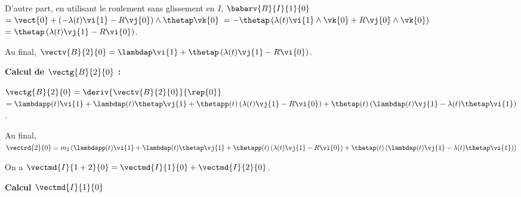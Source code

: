D'autre part, en utilisant le roulement sans glissement en $I$, 
$\babarv{B}{I}{1}{0} $ $=\vect{0}+\left(-\lambda(t)\vi{1}-R\vj{0} \right)\wedge\thetap \vk{0}$
$=-\thetap\left(\lambda(t)\vi{1}\wedge \vk{0}+R\vj{0}\wedge \vk{0} \right)$
$=\thetap\left(\lambda(t)\vj{1}-R\vi{0} \right)$.

Au final, $\vectv{B}{2}{0} = \lambdap\vi{1} + \thetap\left(\lambda(t)\vj{1}-R\vi{0} \right)$.

\vspace{.5cm}

\textbf{Calcul de $ \vectg{B}{2}{0}$ :}

$\vectg{B}{2}{0} = \deriv{\vectv{B}{2}{0}}{\rep{0}}$
$ = \lambdapp(t)\vi{1} +\lambdap(t)\thetap\vj{1} 
+ \thetapp(t)\left(\lambda(t)\vj{1}-R\vi{0} \right)
+ \thetap(t)\left(\lambdap(t)\vj{1}-\lambda(t)\thetap\vi{1} \right)
$.

Au final, $\vectrd{2}{0} =  m_2 \left( \lambdapp(t)\vi{1} +\lambdap(t)\thetap\vj{1} 
+ \thetapp(t)\left(\lambda(t)\vj{1}-R\vi{0} \right)
+ \thetap(t)\left(\lambdap(t)\vj{1}-\lambda(t)\thetap\vi{1} \right)\right)$
\else
\fi

\ifprof
On a $\vectmd{I}{1+2}{0} = \vectmd{I}{1}{0} + \vectmd{I}{2}{0}$.

\textbf{Calcul $\vectmd{I}{1}{0}$}

